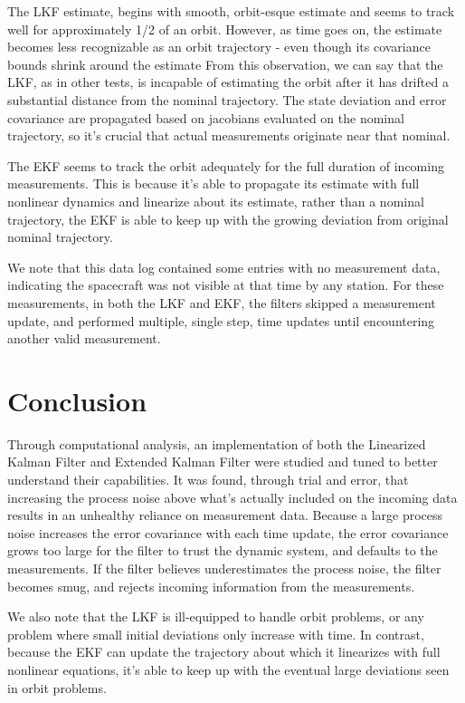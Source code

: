 \documentclass[11pt, a4paper]{article}
\begin{document}
The LKF estimate, begins with smooth, orbit-esque estimate and seems to track well for approximately 1/2 of an orbit. 
However, as time goes on, the estimate becomes less recognizable as an orbit trajectory - even though its covariance bounds shrink around the estimate 
From this observation, we can say that the LKF, as in other tests, is incapable of estimating the orbit after it has drifted a substantial distance from the nominal trajectory. 
The state deviation and error covariance are propagated based on jacobians evaluated on the nominal trajectory, so it's crucial that actual measurements originate near that nominal. 

The EKF seems to track the orbit adequately for the full duration of incoming measurements. 
This is because it's able to propagate its estimate with full nonlinear dynamics and linearize about its estimate, rather than a nominal trajectory, 
the EKF is able to keep up with the growing deviation from original nominal trajectory. 

We note that this data log contained some entries with no measurement data, indicating the spacecraft was not visible at that time by any station. 
For these measurements, in both the LKF and EKF, the filters skipped a measurement update, and performed multiple, single step, time updates until encountering another valid measurement.  

\section{Conclusion}
Through computational analysis, an implementation of both the Linearized Kalman Filter and Extended Kalman Filter were studied and tuned to better understand their capabilities. 
It was found, through trial and error, that increasing the process noise above what's actually included on the incoming data results in an unhealthy reliance on measurement data. 
Because a large process noise increases the error covariance with each time update, the error covariance grows too large for the filter to trust the dynamic system, and defaults to the measurements. 
If the filter believes underestimates the process noise, the filter becomes smug, and rejects incoming information from the measurements. 

We also note that the LKF is ill-equipped to handle orbit problems, or any problem where small initial deviations only increase with time.
In contrast, because the EKF can update the trajectory about which it linearizes with full nonlinear equations, it's able to keep up with the eventual large deviations seen in orbit problems.  
\end{document}
